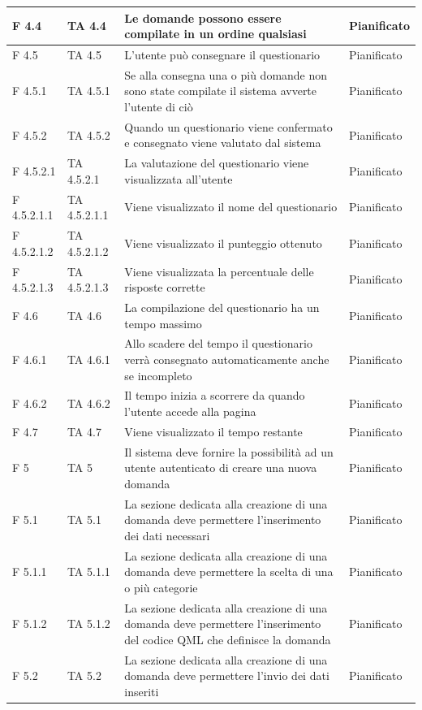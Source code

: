 \documentclass[a4paper,11pt]{article}
\begin{document}
\begin{longtable}{p{}p{}p{}p{}}
\midrule
F 4.4 & TA 4.4 &Le domande possono essere compilate in un ordine qualsiasi & Pianificato\\
\midrule
F 4.5 &TA 4.5 &L'utente può consegnare il questionario & Pianificato\\
\midrule
F 4.5.1 & TA 4.5.1 &Se alla consegna una o più domande non sono state compilate il sistema avverte l'utente di ciò & Pianificato\\
\midrule
F 4.5.2 & TA 4.5.2 &Quando un questionario viene confermato e consegnato viene valutato dal sistema & Pianificato\\
\midrule
F 4.5.2.1 & TA 4.5.2.1 &La valutazione del questionario viene visualizzata all'utente & Pianificato\\
\midrule
F 4.5.2.1.1 &TA 4.5.2.1.1 &Viene visualizzato il nome del questionario & Pianificato\\
\midrule
F 4.5.2.1.2 & TA 4.5.2.1.2 &Viene visualizzato il punteggio ottenuto & Pianificato\\
\midrule
F 4.5.2.1.3 & TA 4.5.2.1.3 &Viene visualizzata la percentuale delle risposte corrette & Pianificato\\
\midrule
F 4.6 & TA 4.6&La compilazione del questionario ha un tempo massimo & Pianificato\\
\midrule
F 4.6.1 & TA 4.6.1 &Allo scadere del tempo il questionario verrà consegnato automaticamente anche se incompleto & Pianificato\\
\midrule
F 4.6.2 & TA 4.6.2 &Il tempo inizia a scorrere da quando l'utente accede alla pagina & Pianificato\\
\midrule
F 4.7 &TA 4.7 &Viene visualizzato il tempo restante & Pianificato\\
\midrule
F 5 & TA 5&Il sistema deve fornire la possibilità ad un utente autenticato di creare una nuova domanda & Pianificato\\
\midrule
F 5.1 &TA 5.1&La sezione dedicata alla creazione di una domanda deve permettere l'inserimento dei dati necessari & Pianificato\\
\midrule
F 5.1.1 & TA 5.1.1 &La sezione dedicata alla creazione di una domanda deve permettere la scelta di una o più categorie & Pianificato\\
\midrule
F 5.1.2 & TA 5.1.2 &La sezione dedicata alla creazione di una domanda deve permettere l'inserimento del codice QML che definisce la domanda & Pianificato\\
\midrule
F 5.2 & TA 5.2&La sezione dedicata alla creazione di una domanda deve permettere l'invio dei dati inseriti & Pianificato\\

\end{longtable}
\end{document}

